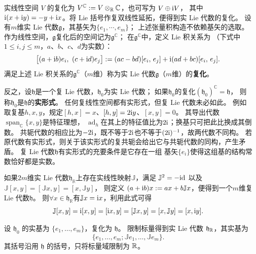 实线性空间 $V$ 的复化为 $V^{\mathbb{C}}:=V\otimes_{\mathbb{R}}\mathbb{C}$，也可写为 $V\oplus\mathrm{i} V$，
其中 $\mathrm{i}(x+\mathrm{i} y)=-y+\mathrm{i} x$。将 Lie 括号作复双线性延拓，便得到实 Lie 代数的复化。
设有$m$维实 Lie 代数$\mathfrak{g}$，其基矢为$\{e_1,\cdots,e_m\}$；
上述张量积构造不依赖基矢的选取。
作为线性空间，$\mathfrak{g}$复化后的空间记为$\mathfrak{g}^{\mathbb{C}}$；
在$\mathfrak{g}^{\mathbb{C}}$中，定义 Lie 积关系为
（下式中$1\leqslant i,j\leqslant m$，$a$、$b$、$c$、$d$为实数）：
\begin{equation}
    \bigl[(a+\mathrm{i} b) e_i,\ (c+\mathrm{i} d) e_j \bigr] :=
    (ac-bd)[e_i,\, e_j] + \mathrm{i} (ad+bc)[e_i,\, e_j].
\end{equation}
满足上述 Lie 积关系的$\mathfrak{g}^{\mathbb{C}}$（$m$维）称为实 Lie 代数$\mathfrak{g}$（$m$维）的\textbf{复化}。

反之，设$\mathfrak{h}$是一个复 Lie 代数，$\mathfrak{h}_{0}$为实 Lie 代数；
如果$\mathfrak{h}_{0}$的复化$(\mathfrak{h}_{0})^{\mathbb{C}}=\mathfrak{h}$，
则称$\mathfrak{h}_{0}$是$\mathfrak{h}$的\textbf{实形式}。
任何复线性空间都有实形式，但复 Lie 代数未必如此。
例如取复基$h,x,y$，规定$[h,x]=x$、$[h,y]=2\mathrm{i} y$、$[x,y]=0$。
其导出代数$\operatorname{span}_{\mathbb C}\{x,y\}$是特征理想，
$\operatorname{ad}_h$在其上的特征值比为$2\mathrm{i}$；换基只可把此比换成其倒数。
共轭代数的相应比为$-2\mathrm{i}$，既不等于$2\mathrm{i}$也不等于$(2\mathrm{i})^{-1}$，故两代数不同构。
若原代数有实形式，则关于该实形式的复共轭会给出它与共轭代数的同构，产生矛盾。
复 Lie 代数$\mathfrak{h}$有实形式的充要条件是它存在一组
基矢$\{e_i\}$使得这组基的结构常数恰好都是实数。

如果$2m$维实 Lie 代数$\mathfrak{h}_{\mathbb{R}}$上存在实线性映射$\mathbb J$，满足
$\mathbb J^2=-\mathrm{id}$ 以及 $\mathbb J[x,y]=[\mathbb Jx,y]=[x,\mathbb Jy]$，
则定义 $(a+\mathrm{i} b)x:=ax+b\mathbb Jx$，便得到一个$m$维复 Lie 代数$\mathfrak h$。
则$\forall x \in \mathfrak{h}_{\mathbb{R}}$有$\mathbb{J} x = \mathrm{i} x$，利用此式可得
\begin{equation}
    \mathbb{J}[x,y]= \mathrm{i} [x,y]=[\mathrm{i} x,y]=[\mathbb{J}x,y]=[x,\mathbb{J}y]=[x,\mathrm{i} y].
\end{equation}

设 $\mathfrak h_0$ 的实基为 $\{e_1,\ldots,e_m\}$，复化为 $\mathfrak h$。
限制标量得到实 Lie 代数 $\mathfrak h_{\mathbb{R}}$，其实基为
\[
    \{e_1,\ldots,e_m;\mathbb J e_1,\ldots,\mathbb J e_m\}.
\]
其括号沿用 $\mathfrak h$ 的括号，只将标量域限制为 $\mathbb{R}$。

